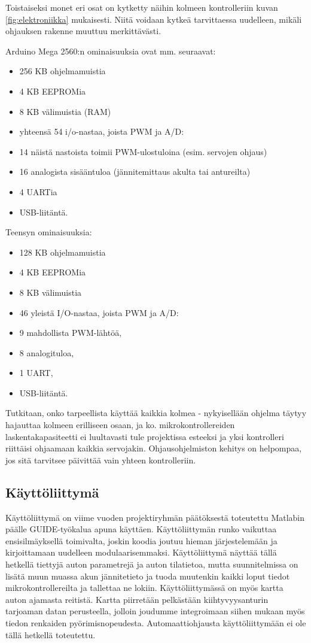 \documentclass{article}
\begin{document}
Toistaiseksi monet eri osat on kytketty näihin kolmeen kontrolleriin kuvan \ref{fig:elektroniikka} mukaisesti. Niitä voidaan kytkeä tarvittaessa uudelleen, mikäli ohjauksen rakenne muuttuu merkittävästi.

Arduino Mega 2560:n ominaisuuksia ovat mm. seuraavat:
\begin{itemize}
	\item 256 KB ohjelmamuistia
	\item 4 KB EEPROMia
	\item 8 KB välimuistia (RAM)
	\item yhteensä 54 i/o-nastaa, joista PWM ja A/D:
	\item 14 näistä nastoista toimii PWM-ulostuloina (esim. servojen ohjaus)
	\item 16 analogista sisääntuloa (jännitemittaus akulta tai antureilta)
	\item 4 UARTia
	\item USB-liitäntä.
\end{itemize}


Teensyn ominaisuuksia:
\begin{itemize}
	\item 128 KB ohjelmamuistia
	\item 4 KB EEPROMia
	\item 8 KB välimuistia
	\item 46 yleistä I/O-nastaa, joista PWM ja A/D:
	\item 9 mahdollista PWM-lähtöä,
	\item 8 analogituloa,
	\item 1 UART,
	\item USB-liitäntä.
\end{itemize}


Tutkitaan, onko tarpeellista käyttää kaikkia kolmea - nykyisellään ohjelma täytyy hajauttaa kolmeen erilliseen osaan, ja ko. mikrokontrollereiden laskentakapasiteetti ei luultavasti tule projektissa esteeksi ja yksi kontrolleri riittäisi ohjaamaan kaikkia servojakin. Ohjausohjelmiston kehitys on helpompaa, jos sitä tarvitsee päivittää vain yhteen kontrolleriin.


\subsection{Käyttöliittymä}


Käyttöliittymä on viime vuoden projektiryhmän päätöksestä toteutettu Matlabin päälle GUIDE-työkalua apuna käyttäen. Käyttöliittymän runko vaikuttaa ensisilmäyksellä toimivalta, joskin koodia joutuu hieman järjestelemään ja kirjoittamaan uudelleen modulaarisemmaksi. Käyttöliittymä näyttää tällä hetkellä tiettyjä auton parametrejä ja auton tilatietoa, mutta suunnitelmissa on lisätä muun muassa akun jännitetieto ja tuoda muutenkin kaikki loput tiedot mikrokontrollereilta ja tallettaa ne lokiin. Käyttöliittymässä on myös kartta auton ajamasta reitistä. Kartta piirretään pelkästään kiihtyvyysanturin tarjoaman datan perusteella, jolloin joudumme integroimaan siihen mukaan myös tiedon renkaiden pyörimisnopeudesta. Automaattiohjausta käyttöliittymään ei ole tällä hetkellä toteutettu.
\end{document}
